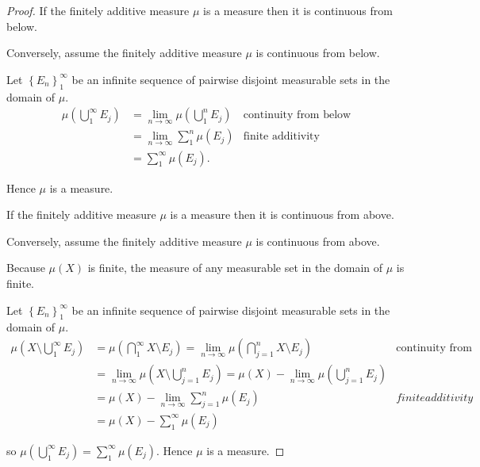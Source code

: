 \begin{proof}
    If the finitely additive measure \( \mu \) is a measure then it is continuous from below.

    Conversely, assume the finitely additive measure \( \mu \) is continuous from below.

    Let \( {\left\{ E_{n} \right\}}_{1}^{\infty} \) be an infinite sequence of pairwise disjoint measurable sets in the domain of \( \mu \).
    \begingroup
    \allowdisplaybreaks%
    \begin{align*}
        \mu\left(\bigcup_{1}^{\infty} E_{j}\right) & = \lim\limits_{n\to \infty} \mu\left(\bigcup_{1}^{n} E_{j}\right) & \text{continuity from below} \\
                                                   & = \lim\limits_{n\to\infty} \sum_{1}^{n} \mu(E_{j})                & \text{finite additivity}     \\
                                                   & = \sum_{1}^{\infty} \mu(E_{j}).
    \end{align*}
    \endgroup

    Hence \( \mu \) is a measure.

    \hrulefill%

    If the finitely additive measure \( \mu \) is a measure then it is continuous from above.

    Conversely, assume the finitely additive measure \( \mu \) is continuous from above.

    Because \( \mu(X) \) is finite, the measure of any measurable set in the domain of \( \mu \) is finite.

    Let \( {\left\{ E_{n} \right\}}_{1}^{\infty} \) be an infinite sequence of pairwise disjoint measurable sets in the domain of \( \mu \).
    \begingroup
    \allowdisplaybreaks%
    \begin{align*}
        \mu\left(X \setminus \bigcup_{1}^{\infty} E_{j}\right) & = \mu\left(\bigcap_{1}^{\infty} X \setminus E_{j}\right) = \lim\limits_{n\to\infty} \mu\left(\bigcap_{j=1}^{n} X\setminus E_{j}\right)                         & \text{continuity from above} \\
                                                               & = \lim\limits_{n\to\infty} \mu\left( X \setminus \bigcup_{j=1}^{n} E_{j} \right) = \mu(X) - \lim\limits_{n\to\infty} \mu\left( \bigcup_{j=1}^{n} E_{j} \right)                                \\
                                                               & = \mu(X) - \lim\limits_{n\to\infty} \sum_{j=1}^{n} \mu(E_{j})                                                                                                  & finite additivity            \\
                                                               & = \mu(X) - \sum_{1}^{\infty} \mu(E_{j})
    \end{align*}
    \endgroup

    so \( \mu\left(\bigcup_{1}^{\infty} E_{j}\right) = \sum_{1}^{\infty} \mu(E_{j}) \). Hence \( \mu \) is a measure.
\end{proof}

